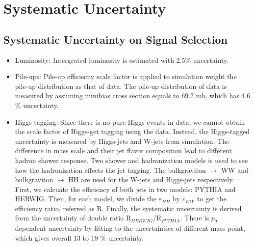 
\chapter{Systematic Uncertainty} \label{chap:5}

\section{Systematic Uncertainty on Signal Selection} \label{Event reconstruction and selection}

\begin{itemize}
  \item Luminosity: Intergrated luminosity is estimated with 2.5$\% $ uncertainty\citep{CMS-PAS-LUM-17-001}. 
  \item Pile-ups: Pile-up efficiecny scale factor is applied to simulation weight the pile-up distribution as that of data. The pile-up distribution of data is measured by assuming minibias cross section equals to 69.2 mb, which has 4.6$\% $ uncertainty. 
  \item Higgs tagging: Since there is no pure Higgs events in data, we cannot obtain the scale factor of Higgs-get tagging using the data. Instead, the Higgs-tagged uncertainty is measured by Higgs-jets and W-jets from simulation. The difference in mass scale and their jet flavor composition lead to different hadron shower response. Two shower and hadronization models is used to see how the hadronization effects the jet tagging. The bulkgraviton $\rightarrow$ WW and bulkgraviton $\rightarrow$ HH are used for the W-jets and Higgs-jets respectively. First, we calcuate the efficiency of both jets in two models: PYTHIA and  HERWIG. Then, for each model, we divide the $\varepsilon_{HH}$ by $\varepsilon_{WW}$ to get the efficiency ratio, referred as R. Finally, the systematic uncertainty is derived from the uncertainty of double ratio R$_{HERWIG}$/R$_{PYTHIA}$. There is $p_{T}$ dependent uncertainty by fitting to the uncertainties of different mass point, which gives overall 13 to 19 $\% $ uncertainty\citep{AN-16-300}.
  

\end{itemize}
